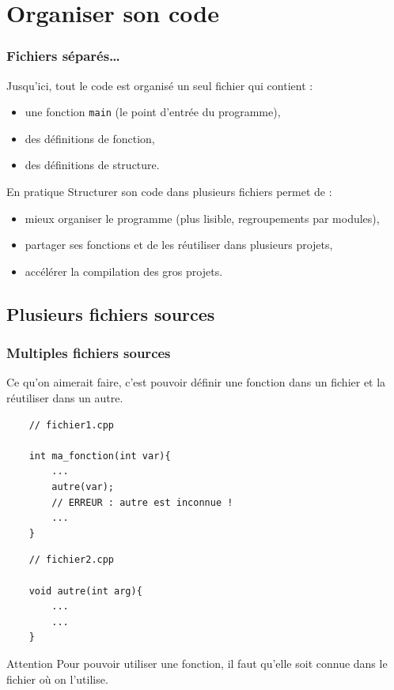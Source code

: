 \section{Organiser son code}

\begin{frame}
\frametitle{Fichiers séparés\dots}

Jusqu'ici, tout le code est organisé un seul fichier qui contient :
\begin{itemize}
	\item une fonction \texttt{main} (le point d'entrée du programme),
    \item des définitions de fonction,
    \item des définitions de structure.
\end{itemize}

\begin{block}{En pratique}
Structurer son code dans plusieurs fichiers permet de :
\begin{itemize}
	\item mieux organiser le programme (plus lisible, regroupements par modules),
    \item partager ses fonctions et de les réutiliser dans plusieurs projets,
    \item accélérer la compilation des gros projets.
\end{itemize}
\end{block}
\end{frame}

\subsection{Plusieurs fichiers sources}

\begin{frame}[fragile=singleslide]
\frametitle{Multiples fichiers sources}
Ce qu'on aimerait faire, c'est pouvoir définir une fonction dans un fichier et la réutiliser dans un autre.
  \begin{minipage}{0.49\textwidth}
  	\begin{verbatim}
	// fichier1.cpp
	
	int ma_fonction(int var){
		...
		autre(var);
		// ERREUR : autre est inconnue !
		...
    }
	\end{verbatim}
  \end{minipage}
  \begin{minipage}{0.49\textwidth}
	\begin{verbatim}
	// fichier2.cpp
	
	void autre(int arg){
		...
		...
	}
	\end{verbatim}
  \end{minipage}
\begin{alertblock}{Attention}
Pour pouvoir utiliser une fonction, il faut qu'elle soit connue dans le fichier où on l'utilise.
\end{alertblock}
\end{frame}

